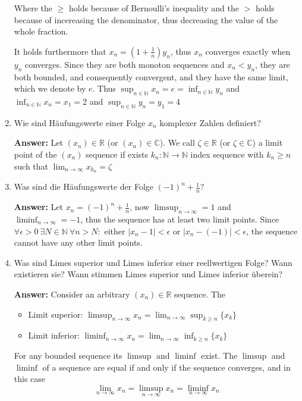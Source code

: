 \documentclass[11pt]{article}
\newcommand{\abs}[1]{\left|#1\right|}
\newcommand{\RR}[0]{\mathbb{R}}
\newcommand{\CC}[0]{\mathbb{C}}
\newcommand{\NN}[0]{\mathbb{N}}
\begin{document}
\begin{enumerate}
    Where the $\ge$ holds because of Bernoulli's inequality and the $>$ holds because of incereasing the denominator, thus decreasing the value of the whole fraction.

    It holds furthermore that $x_n = \left(1 + \frac{1}{n}\right)y_n$, thus $x_n$ converges exactly when $y_n$ converges. Since they are both monoton sequences and $x_n < y_n$, they are both bounded, and consequently convergent, and they have the same limit, which we denote by $e$. Thus $\sup_{n \in \NN} x_n = e = \inf_{n \in \NN} y_n$ and $\inf_{n \in \NN} x_n = x_1 = 2$ and $\sup_{n \in \NN} y_n = y_1 = 4$

    \item Wie sind Häufungswerte einer Folge $x_n$ komplexer Zahlen definiert?

    \textbf{Answer:}
    Let $(x_n) \in \RR$ (or $(x_n) \in \CC$). We call $\zeta \in \RR$ (or $\zeta \in \CC$) a limit point of the $(x_n)$ sequence if exists $k_n\colon\NN \to \NN$ index sequence with $k_n \ge n$ such that $\lim_{n\to\infty}x_{k_n} = \zeta$

    \item Was sind die Häufungswerte der Folge $(-1)^n + \frac{1}{n}$?

    \textbf{Answer:} Let $x_n = (-1)^n + \frac{1}{n}$, now $\limsup_{n\to\infty} = 1$ and $\liminf_{n\to\infty} = -1$, thus the sequence has at least two limit points. Since $\forall \epsilon > 0~\exists N \in \NN~\forall n > N\colon$ either $\abs{x_n - 1} < \epsilon$ or $\abs{x_n - (-1)} < \epsilon$, the sequence cannot have any other limit points.

    \item Was sind Limes superior und Limes inferior einer reellwertigen Folge? Wann existieren sie? Wann stimmen Limes superior und Limes inferior überein?

    \textbf{Answer:} Consider an arbitrary $(x_n) \in \RR$ sequence. The
    \begin{itemize}
        \item Limit superior: $\limsup_{n\to\infty} x_n = \lim_{n\to\infty} \sup_{k \ge n}  \{x_k\}$
        \item Limit inferior: $\liminf_{n\to\infty} x_n = \lim_{n\to\infty} \inf_{k \ge n}  \{x_k\}$
    \end{itemize}
    For any bounded sequence its $\limsup$ and $\liminf$ exist. The $\limsup$ and $\liminf$ of a sequence are equal if and only if the sequence converges, and in this case $$\lim_{n\to\infty} x_n = \limsup_{n\to\infty} x_n = \liminf_{n\to\infty} x_n$$


\end{enumerate}
\end{document}
